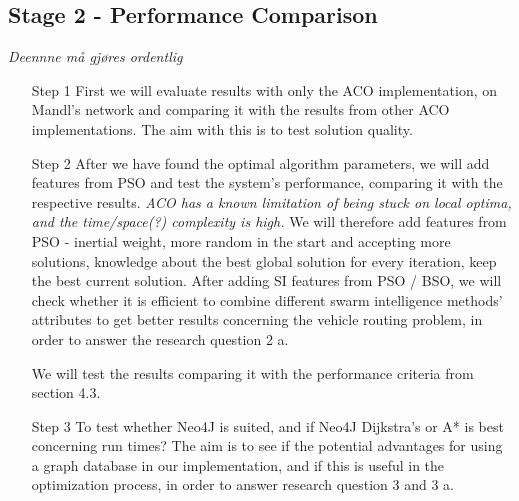\subsection{Stage 2 - Performance Comparison}
\emph{\color{red}Deennne må gjøres ordentlig}
\begin{itemize}
\item[Step 1] First we will evaluate results with only the ACO implementation, on Mandl's network and comparing it with the results from other ACO implementations. The aim with this is to test solution quality.

\item[Step 2]After we have found the optimal algorithm parameters, we will add features from PSO and test the system's performance, comparing it with the respective results. \emph{\color{red}ACO has a known limitation of being stuck on local optima, and the time/space(?) complexity is high.} We will therefore 
add features from PSO - inertial weight, more random in the start and accepting more solutions, knowledge about the best global solution for every iteration, keep the best current solution. After adding SI features from PSO / BSO, we will check whether it is efficient to combine different swarm intelligence methods' attributes to get better results concerning the vehicle routing problem, in order to answer the research question 2 a.

We will test the results comparing it with the performance criteria from section 4.3.

\item[Step 3]To test whether Neo4J is suited, and if Neo4J Dijkstra's or A* is best concerning run times? The aim is to see if the potential advantages for using a graph database in our implementation, and if this is useful in the optimization process, in order to answer research question 3 and 3 a.

\end{itemize}




